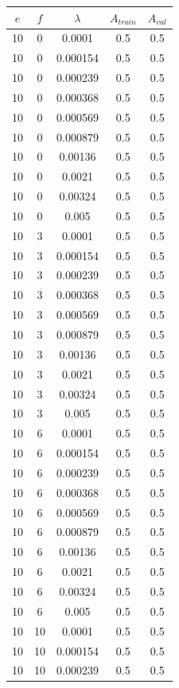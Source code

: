\begin{table}[ht]
\centering
\begin{tabular}{ |c|c|c|c|c| }
\hline
$e$ & $f$ & $\lambda$ & $A_{train}$ & $A_{val}$ \\
\hline
10 & 0 & 0.0001 & 0.5 & 0.5 \\
10 & 0 & 0.000154 & 0.5 & 0.5 \\
10 & 0 & 0.000239 & 0.5 & 0.5 \\
10 & 0 & 0.000368 & 0.5 & 0.5 \\
10 & 0 & 0.000569 & 0.5 & 0.5 \\
10 & 0 & 0.000879 & 0.5 & 0.5 \\
10 & 0 & 0.00136 & 0.5 & 0.5 \\
10 & 0 & 0.0021 & 0.5 & 0.5 \\
10 & 0 & 0.00324 & 0.5 & 0.5 \\
10 & 0 & 0.005 & 0.5 & 0.5 \\
10 & 3 & 0.0001 & 0.5 & 0.5 \\
10 & 3 & 0.000154 & 0.5 & 0.5 \\
10 & 3 & 0.000239 & 0.5 & 0.5 \\
10 & 3 & 0.000368 & 0.5 & 0.5 \\
10 & 3 & 0.000569 & 0.5 & 0.5 \\
10 & 3 & 0.000879 & 0.5 & 0.5 \\
10 & 3 & 0.00136 & 0.5 & 0.5 \\
10 & 3 & 0.0021 & 0.5 & 0.5 \\
10 & 3 & 0.00324 & 0.5 & 0.5 \\
10 & 3 & 0.005 & 0.5 & 0.5 \\
10 & 6 & 0.0001 & 0.5 & 0.5 \\
10 & 6 & 0.000154 & 0.5 & 0.5 \\
10 & 6 & 0.000239 & 0.5 & 0.5 \\
10 & 6 & 0.000368 & 0.5 & 0.5 \\
10 & 6 & 0.000569 & 0.5 & 0.5 \\
10 & 6 & 0.000879 & 0.5 & 0.5 \\
10 & 6 & 0.00136 & 0.5 & 0.5 \\
10 & 6 & 0.0021 & 0.5 & 0.5 \\
10 & 6 & 0.00324 & 0.5 & 0.5 \\
10 & 6 & 0.005 & 0.5 & 0.5 \\
10 & 10 & 0.0001 & 0.5 & 0.5 \\
10 & 10 & 0.000154 & 0.5 & 0.5 \\
10 & 10 & 0.000239 & 0.5 & 0.5 \\

\end{tabular}
\end{table}
